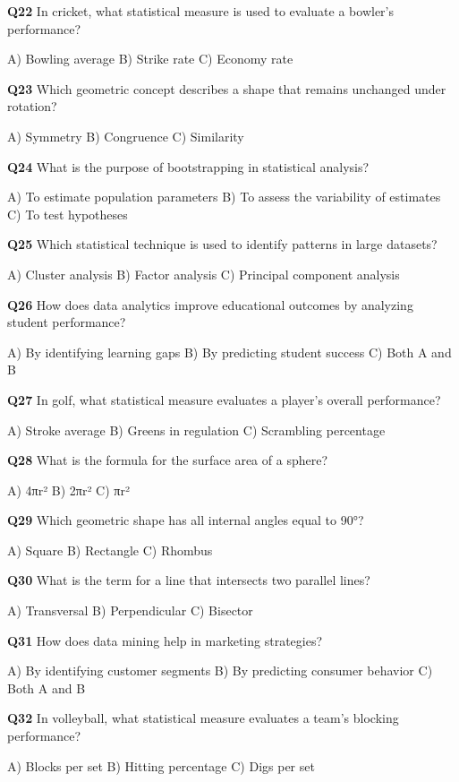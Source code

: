 \textbf{Q22} In cricket, what statistical measure is used to evaluate a bowler's performance?\par
    A) Bowling average  
    B) Strike rate  
    C) Economy rate

\textbf{Q23} Which geometric concept describes a shape that remains unchanged under rotation?\par
    A) Symmetry  
    B) Congruence  
    C) Similarity

\textbf{Q24} What is the purpose of bootstrapping in statistical analysis?\par
    A) To estimate population parameters  
    B) To assess the variability of estimates  
    C) To test hypotheses

\textbf{Q25} Which statistical technique is used to identify patterns in large datasets?\par
    A) Cluster analysis  
    B) Factor analysis  
    C) Principal component analysis

\textbf{Q26} How does data analytics improve educational outcomes by analyzing student performance?\par
    A) By identifying learning gaps  
    B) By predicting student success  
    C) Both A and B

\textbf{Q27} In golf, what statistical measure evaluates a player's overall performance?\par
    A) Stroke average  
    B) Greens in regulation  
    C) Scrambling percentage

\textbf{Q28} What is the formula for the surface area of a sphere?\par
    A) 4πr²  
    B) 2πr²  
    C) πr²

\textbf{Q29} Which geometric shape has all internal angles equal to 90°?\par
    A) Square  
    B) Rectangle  
    C) Rhombus

\textbf{Q30} What is the term for a line that intersects two parallel lines?\par
    A) Transversal  
    B) Perpendicular  
    C) Bisector

\textbf{Q31} How does data mining help in marketing strategies?\par
    A) By identifying customer segments  
    B) By predicting consumer behavior  
    C) Both A and B

\textbf{Q32} In volleyball, what statistical measure evaluates a team's blocking performance?\par
    A) Blocks per set  
    B) Hitting percentage  
    C) Digs per set

